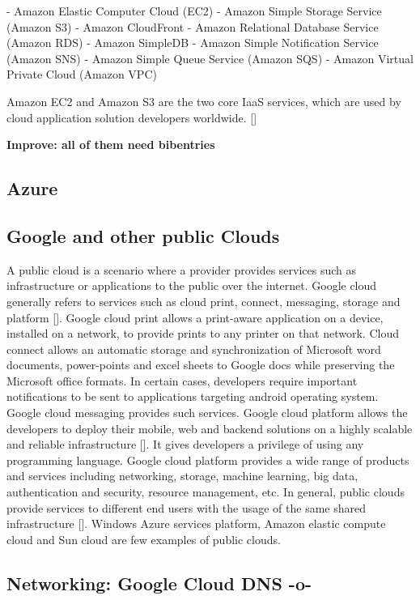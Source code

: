      -  Amazon Elastic Computer Cloud (EC2)
     -  Amazon Simple Storage Service (Amazon S3)
     -  Amazon CloudFront
     -  Amazon Relational Database Service (Amazon RDS)
     -  Amazon SimpleDB
     -  Amazon Simple Notification Service (Amazon SNS)
     -  Amazon Simple Queue Service (Amazon SQS)
     -  Amazon Virtual Private Cloud (Amazon VPC)

Amazon EC2 and Amazon S3 are the two core IaaS services, which are
used by cloud application solution developers
worldwide. [\cite{www-aws}]

     {\bf Improve: all of them need bibentries}
     
\subsection{Azure}
\subsection{Google and other public Clouds}

A public cloud is a scenario where a provider provides services such
as infrastructure or applications to the public over the
internet. Google cloud generally refers to services such as cloud
print, connect, messaging, storage and platform [\cite{goo1}]. Google
cloud print allows a print-aware application on a device, installed on
a network, to provide prints to any printer on that network. Cloud
connect allows an automatic storage and synchronization of Microsoft
word documents, power-points and excel sheets to Google docs while
preserving the Microsoft office formats. In certain cases, developers
require important notifications to be sent to applications targeting
android operating system. Google cloud messaging provides such
services. Google cloud platform allows the developers to deploy their
mobile, web and backend solutions on a highly scalable and reliable
infrastructure [\cite{goo2}]. It gives developers a privilege of using
any programming language. Google cloud platform provides a wide range
of products and services including networking, storage, machine
learning, big data, authentication and security, resource management,
etc. In general, public clouds provide services to different end users
with the usage of the same shared infrastructure [\cite{goo3}]. Windows
Azure services platform, Amazon elastic compute cloud and Sun cloud
are few examples of public clouds.
     
\subsection{Networking: Google Cloud DNS -o-}

